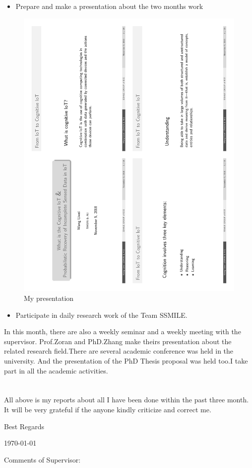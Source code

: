 \documentclass[12pt]{article}
\begin{document}
\begin{itemize}
    \item Prepare and make a presentation about the two months work
\end{itemize}  
\par \vspace{-0.4cm}
\begin{figure}[h!]
\centering
\includegraphics[scale=0.4, angle=-90]{Presentation_1_4.pdf}
\caption{My presentation}
\label{fig:My presentation}
\end{figure}


\begin{itemize}
    \item Participate in daily research work of the Team SSMILE.
\end{itemize}  
\par \vspace{-0.4cm}
In this month, there are also a weekly seminar and a weekly meeting with the supervisor. Prof.Zoran and PhD.Zhang make theirs presentation about the related research field.There are several academic conference was held  in the university. And the presentation of the PhD Thesis proposal was held too.I take part in all the academic activities.

\section*{\vspace{-1cm}}
All above is my reports about all I have been done within the past three month. It will be very grateful if the anyone kindly criticize and correct me.

\par
\vspace{1cm}
 \quad Best Regards

\vspace{2cm}
 \quad  \today


\vspace{1cm}
 \quad Comments of Supervisor:
\end{document}
